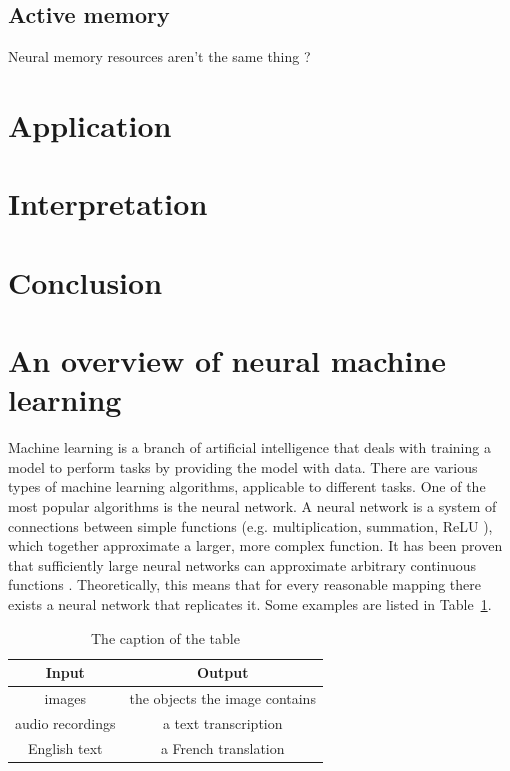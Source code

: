 \documentclass{article}
\begin{document}
\subsection{Active memory}

Neural memory resources aren't the same thing \cite{neural_turing}?

\section{Application}

\section{Interpretation}

\section{Conclusion}

\appendix
\section{An overview of neural machine learning}

Machine learning is a branch of artificial intelligence that deals with training a model to perform tasks by providing the model with data. There are various types of machine learning algorithms, applicable to different tasks. One of the most popular algorithms is the neural network. A neural network is a system of connections between simple functions (e.g. multiplication, summation, ReLU \cite{relu}), which together approximate a larger, more complex function. It has been proven that sufficiently large neural networks can approximate arbitrary continuous functions \cite{universal_approximators}. Theoretically, this means that for every reasonable mapping there exists a neural network that replicates it. Some examples are listed in Table~\ref{table:mappings}.

\begin{table}
    \centering
    \begin{tabular}{|c|c|}
        \hline
        \textbf{Input} & \textbf{Output} \\
        \hline
        images & the objects the image contains \\
        audio recordings & a text transcription \\
        English text & a French translation \\
        \hline
    \end{tabular}
    \caption{The caption of the table}\label{table:mappings}
\end{table}
\end{document}
